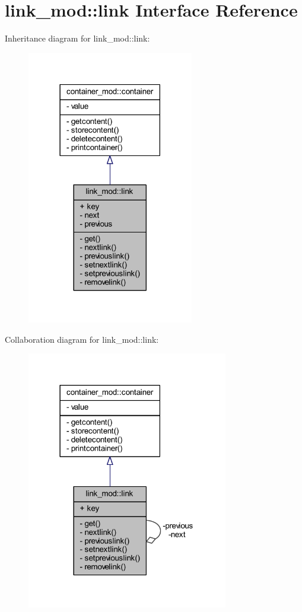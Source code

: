 \hypertarget{structlink__mod_1_1link}{}\section{link\+\_\+mod\+:\+:link Interface Reference}
\label{structlink__mod_1_1link}


Inheritance diagram for link\+\_\+mod\+:\+:link\+:\nopagebreak
\begin{figure}[H]
\begin{center}
\leavevmode
\includegraphics[width=206pt]{structlink__mod_1_1link__inherit__graph}
\end{center}
\end{figure}


Collaboration diagram for link\+\_\+mod\+:\+:link\+:\nopagebreak
\begin{figure}[H]
\begin{center}
\leavevmode
\includegraphics[width=249pt]{structlink__mod_1_1link__coll__graph}
\end{center}
\end{figure}
